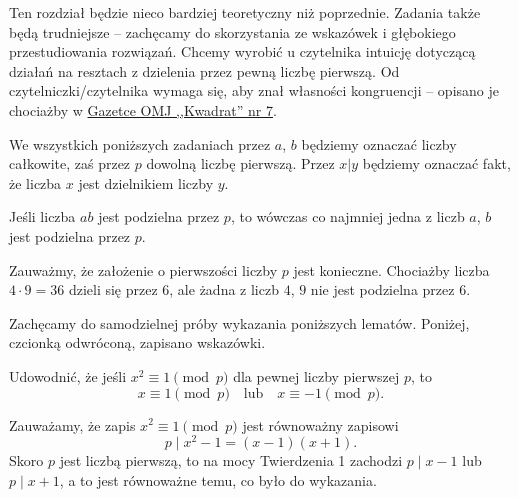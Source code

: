 



\noindent
Ten rozdział będzie nieco bardziej teoretyczny niż poprzednie. Zadania także będą trudniejsze -- zachęcamy do skorzystania ze wskazówek i głębokiego przestudiowania rozwiązań. Chcemy wyrobić u czytelnika intuicję dotyczącą działań na resztach z dzielenia przez pewną liczbę pierwszą. Od czytelniczki/czytelnika wymaga się, aby znał własności kongruencji -- opisano je chociażby w  \href{https://omj.edu.pl/uploads/attachments/kwadrat-07-kolor.pdf}{Gazetce OMJ ,,Kwadrat'' nr 7}. 

\vspace{5px}

\noindent
We wszystkich poniższych zadaniach przez $a$, $b$ będziemy oznaczać liczby całkowite, zaś przez $p$ dowolną liczbę pierwszą. Przez $x \big| y$ będziemy oznaczać fakt, że liczba $x$ jest dzielnikiem liczby $y$.

\vspace{5px}

\noindent
Jeśli liczba $ab$ jest podzielna przez $p$, to wówczas co najmniej jedna z liczb $a$, $b$ jest podzielna przez $p$.

\vspace{15px}

\noindent
Zauważmy, że założenie o pierwszości liczby $p$ jest konieczne. Chociażby liczba $4 \cdot 9 = 36$ dzieli się przez $6$, ale żadna z liczb $4$, $9$ nie jest podzielna przez $6$.

\vspace{5px}
\noindent
Zachęcamy do samodzielnej próby wykazania poniższych lematów. Poniżej, czcionką odwróconą, zapisano wskazówki.

\vspace{5px}

\noindent
Udowodnić, że jeśli $x^2\equiv 1 \pmod{p}$ dla pewnej liczby pierwszej $p$, to \[   
    x\equiv 1 \pmod{p} \quad \text{lub} \quad x\equiv -1 \pmod{p}.
\]



\noindent
Zauważamy, że zapis $x^2\equiv 1 \pmod{p}$ jest równoważny zapisowi 
\[
    p \mid x^2-1=(x-1)(x+1).
\]
 Skoro $p$ jest liczbą pierwszą, to na mocy Twierdzenia 1 zachodzi $p\mid x-1$ lub $p\mid x+1$, a to jest równoważne temu, co było do wykazania.
 
